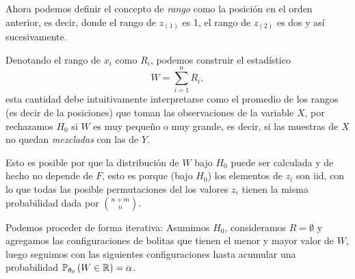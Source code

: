 Ahora podemos definir el concepto de \emph{rango} como la posición en el orden anterior, es decir, donde el rango de $z_{(1)}$ es 1, el rango de $z_{(2)}$ es dos  y así sucesivamente. 


Denotando el rango de $x_i$ como $R_i$, podemos construir el estadístico
\begin{equation}
 	W = \sum_{i=1}^{n}R_i,
 \end{equation} 
esta cantidad debe intuitivamente interpretarse como el promedio de los rangos (es decir de la posiciones) que toman las observaciones de la variable $X$, por rechazamos $H_0$ si $W$ es muy pequeño o muy grande, es decir, si las muestras de $X$ no quedan \emph{mezcladas} con las de $Y$. 

 Esto es posible por que la distribución de $W$ bajo $H_0$ puede ser calculada y de hecho no depende de $F$, esto es porque (bajo $H_0$) los elementos de $z_i$ son iid, con lo que todas las posible permutaciones del los valores $z_i$ tienen la misma probabilidad dada por $\binom{n+m}{n}$.

 \begin{remark}
 	Podemos proceder de forma iterativa: Asumimos $H_0$, consideramos $R=\emptyset$ y agregamos las configuraciones de bolitas que tienen el menor y mayor valor de $W$, luego seguimos con las siguientes configuraciones hasta acumular una probabilidad $\mathbb{P}_{\theta_0} \left(W\in{\mathbb R}\right) = \alpha$.
 \end{remark}

